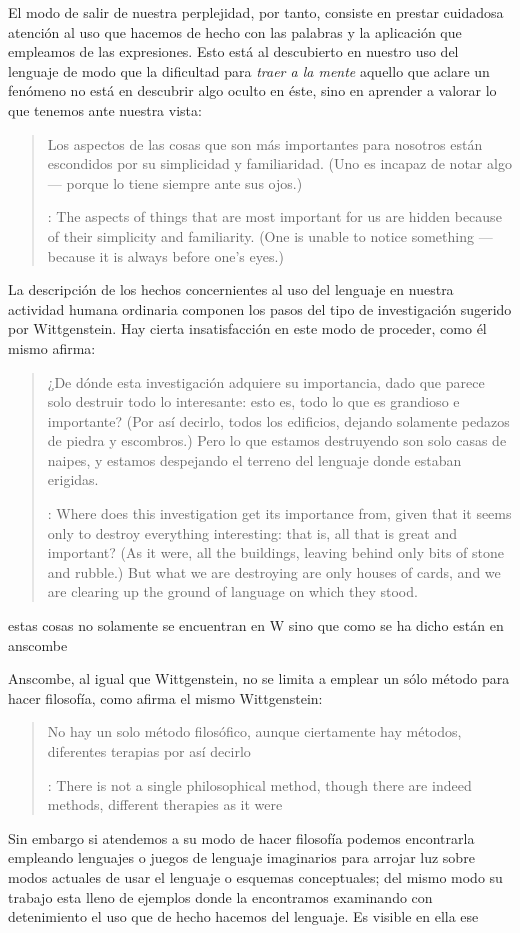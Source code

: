 El modo de salir de nuestra perplejidad, por tanto, consiste en prestar
cuidadosa atención al uso que hacemos de hecho con las palabras y la aplicación
que empleamos de las expresiones. Esto está al descubierto en nuestro uso del
lenguaje de modo que la dificultad para \emph{traer a la mente} aquello que
aclare un fenómeno no está en descubrir algo oculto en éste, sino en aprender a
valorar lo que tenemos ante nuestra vista:
\blockquote[{\cite[\S129]{wittgenstein1953phiinv}}: The aspects of things that
are most important for us are hidden because of their simplicity and
familiarity. (One is unable to notice something --- because it is always before
one's eyes.)]{Los aspectos de las cosas que son más importantes para nosotros
  están escondidos por su simplicidad y familiaridad. (Uno es incapaz de notar
  algo --- porque lo tiene siempre ante sus ojos.)}
La descripción de los hechos concernientes al uso del lenguaje en nuestra
actividad humana ordinaria componen los pasos del tipo de investigación sugerido
por Wittgenstein. Hay cierta insatisfacción en este modo de proceder, como él
mismo afirma:
\blockquote[{\cite[\S118]{wittgenstein1953phiinv}}: Where does this
investigation get its importance from, given that it seems only to destroy
everything interesting: that is, all that is great and important? (As it were,
all the buildings, leaving behind only bits of stone and rubble.) But what we
are destroying are only houses of cards, and we are clearing up the ground of
language on which they stood.]{¿De dónde esta investigación adquiere su
  importancia, dado que parece solo destruir todo lo interesante: esto es, todo
  lo que es grandioso e importante? (Por así decirlo, todos los edificios,
  dejando solamente pedazos de piedra y escombros.) Pero lo que estamos
  destruyendo son solo casas de naipes, y estamos despejando el terreno del
  lenguaje donde estaban erigidas.}


estas cosas no solamente se encuentran en W
sino que como se ha dicho están en anscombe


Anscombe, al igual que Wittgenstein, no se limita a emplear un sólo método para
hacer filosofía, como afirma el mismo Wittgenstein:

\blockquote[{\cite[\S133]{wittgenstein1953phiinv}}: There is not a single
philosophical method, though there are indeed methods, different therapies as it
were]{No hay un solo método filosófico, aunque ciertamente hay métodos,
  diferentes terapias por así decirlo}


Sin embargo si atendemos a su modo de hacer filosofía podemos encontrarla
empleando lenguajes o juegos de lenguaje imaginarios para arrojar luz sobre
modos actuales de usar el lenguaje o esquemas conceptuales; del mismo modo su
trabajo esta lleno de ejemplos donde la encontramos examinando con detenimiento
el uso que de hecho hacemos del
lenguaje.\autocite[Cf.~][228--229]{teichmann2008ans} Es visible en ella ese

